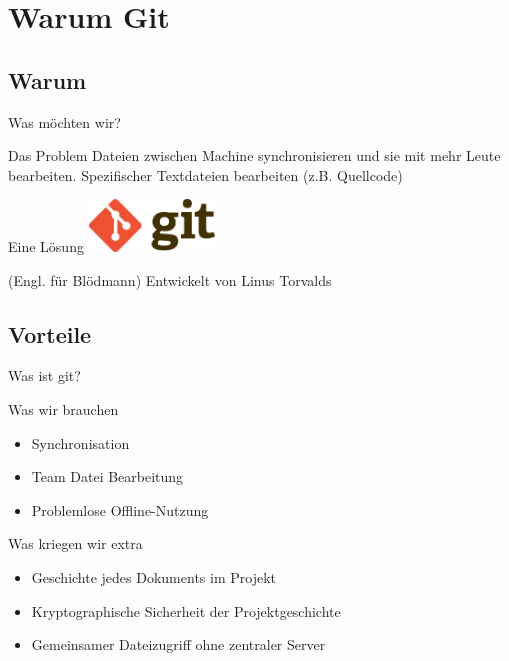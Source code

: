 \section{Warum Git}

\subsection{Warum}
\begin{frame}{Was m\"ochten wir?}
	\begin{block}{Das Problem}
		Dateien zwischen Machine synchronisieren und sie mit mehr Leute
		bearbeiten. Spezifischer Textdateien bearbeiten (z.B. Quellcode)
	\end{block}
	\pause

	\begin{block}{Eine L\"osung}
	\centering
	\vspace{1em}
	\includegraphics[width=0.25\textwidth]{pic/git.png}\\
	\vspace{1em}

	(Engl. f\"ur Bl\"odmann) Entwickelt von Linus Torvalds
	\end{block}
\end{frame}

\subsection{Vorteile}
\begin{frame}{Was ist git?}
	\begin{block}{Was wir brauchen}
	\begin{itemize}
		\item Synchronisation
		\item Team Datei Bearbeitung
		\item Problemlose Offline-Nutzung
	\end{itemize}
	\end{block}
	\pause

	\begin{block}{Was kriegen wir extra}
	\begin{itemize}
		\item Geschichte jedes Dokuments im Projekt
		\item Kryptographische Sicherheit der Projektgeschichte
		\item Gemeinsamer Dateizugriff ohne zentraler Server 
	\end{itemize}
	\end{block}
\end{frame}

